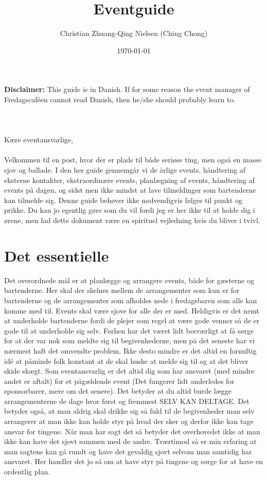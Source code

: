 

\title{Eventguide}
\date{\today}
\author{Christian Zhuang-Qing Nielsen (Ching Chong)}



\maketitle
\noindent\textbf{Disclaimer:} This guide is in Danish. If for some reason the event manager of Fredagscaféen cannot read Danish, then he/she should probably learn to.
\\ \\ \\ \\
\noindent Kære eventansvarlige,
\\ \\
Velkommen til en post, hvor der er plads til både seriøse ting, men også en masse sjov og ballade. I den her guide gennemgår vi de årlige events, håndtering af eksterne kontakter, ekstraordinære events, planlægning af events, håndtering af events på dagen, og sidst men ikke mindst at lave tilmeldinger som bartenderne kan tilmelde sig. Denne guide behøver ikke nødvendigvis følges til punkt og prikke. Du kan jo egentlig gøre som du vil fordi jeg er her ikke til at holde dig i ørene, men lad dette dokument være en spirituel vejledning hvis du bliver i tvivl.

\section*{Det essentielle}
\label{sec:det-essentielle}

Det overordnede mål er at planlægge og arrangere events, både for gæsterne 
og bartenderne. Her skal der skelnes mellem de arrangementer som kun er for bartenderne og de arrangementer som afholdes nede i fredagsbaren som alle kan komme med til. Events skal være sjove for alle der er med. Heldigvis er det nemt at underholde bartenderne fordi de plejer som regel at være gode venner så de er gode til at underholde sig selv. Førhen har det været lidt besværligt at få sørge for at der var nok som meldte sig til begivenhederne, men på det seneste har vi nærmest haft det omvendte problem. Ikke desto mindre er det altid en fornuftig idé at påminde folk konstant at de skal huske at melde sig til og at det bliver skide skægt. Som eventansvarlig er det altid dig som har ansvaret (med mindre andet er aftalt) for et pågældende event (Det fungerer lidt anderledes for sponsorbarer, mere om det senere). Det betyder at du altid burde lægge arrangementerne de dage hvor først og fremmest SELV KAN DELTAGE. Det betyder også, at man aldrig skal drikke sig så fuld til de begivenheder man selv arrangerer at man ikke kan holde styr på hvad der sker og derfor ikke kan tage ansvar for tingene. Når man har sagt det så betyder det overhovedet ikke at man ikke kan have det sjovt sammen med de andre. Tværtimod så er min erfaring at man sagtens kan gå rundt og have det gevaldig sjovt selvom man samtidig har ansvaret. Her handler det jo så om at have styr på tingene og sørge for at have en ordentlig plan.

